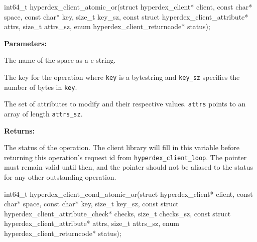 \funcsep
{}
\begin{ccode}
int64_t hyperdex_client_atomic_or(struct hyperdex_client* client,
                const char* space,
                const char* key, size_t key_sz,
                const struct hyperdex_client_attribute* attrs, size_t attrs_sz,
                enum hyperdex_client_returncode* status);
\end{ccode}
\funcdesc 

\noindent\textbf{Parameters:}
\begin{description}[labelindent=\widthof{{\texttt{attrs}, \texttt{attrs\_sz}}},leftmargin=*,noitemsep,nolistsep,align=right]
\item[\texttt{space}] The name of the space as a c-string.
\item[\texttt{key}, \texttt{key\_sz}] The key for the operation where \texttt{key} is a bytestring and \texttt{key\_sz} specifies the number of bytes in \texttt{key}.
\item[\texttt{attrs}, \texttt{attrs\_sz}] The set of attributes to modify and their respective values.  \texttt{attrs} points to an array of length \texttt{attrs\_sz}.
\end{description}

\noindent\textbf{Returns:}
\begin{description}[labelindent=\widthof{{\texttt{status}}},leftmargin=*,noitemsep,nolistsep,align=right]
\item[\texttt{status}] The status of the operation.  The client library will fill in this variable before returning this operation's request id from \texttt{hyperdex\_client\_loop}.  The pointer must remain valid until then, and the pointer should not be aliased to the status for any other outstanding operation.
\end{description}

\funcsep
{}
\begin{ccode}
int64_t hyperdex_client_cond_atomic_or(struct hyperdex_client* client,
                const char* space,
                const char* key, size_t key_sz,
                const struct hyperdex_client_attribute_check* checks, size_t checks_sz,
                const struct hyperdex_client_attribute* attrs, size_t attrs_sz,
                enum hyperdex_client_returncode* status);
\end{ccode}
\funcdesc 

